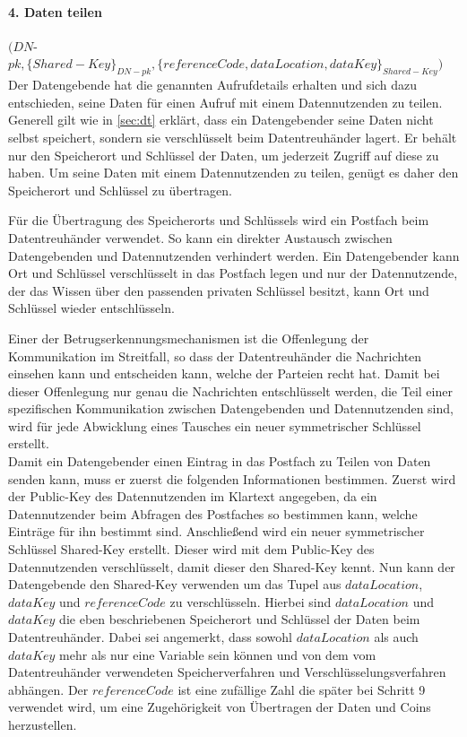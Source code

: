 \documentclass{scrreprt}
\begin{document}
\paragraph{4. Daten teilen} $(DN$-$pk, \{Shared-Key\}_{DN-pk}, \{referenceCode, dataLocation, dataKey\}_{Shared-Key})$\\
Der Datengebende hat die genannten Aufrufdetails erhalten und sich dazu entschieden, seine Daten für einen Aufruf mit einem Datennutzenden zu teilen. Generell gilt wie in \ref{sec:dt} erklärt, dass ein Datengebender seine Daten nicht selbst speichert, sondern sie verschlüsselt beim Datentreuhänder lagert. Er behält nur den Speicherort und Schlüssel der Daten, um jederzeit Zugriff auf diese zu haben. Um seine Daten mit einem Datennutzenden zu teilen, genügt es daher den Speicherort und Schlüssel zu übertragen.

Für die Übertragung des Speicherorts und Schlüssels wird ein Postfach beim Datentreuhänder verwendet. So kann ein direkter Austausch zwischen Datengebenden und Datennutzenden verhindert werden. Ein Datengebender kann Ort und Schlüssel verschlüsselt in das Postfach legen und nur der Datennutzende, der das Wissen über den passenden privaten Schlüssel besitzt, kann Ort und Schlüssel wieder entschlüsseln.

Einer der Betrugserkennungsmechanismen ist die Offenlegung der Kommunikation im Streitfall, so dass der Datentreuhänder die Nachrichten einsehen kann und entscheiden kann, welche der Parteien recht hat. Damit bei dieser Offenlegung nur genau die Nachrichten entschlüsselt werden, die Teil einer spezifischen Kommunikation zwischen Datengebenden und Datennutzenden sind, wird für jede Abwicklung eines Tausches ein neuer symmetrischer Schlüssel erstellt.\\

Damit ein Datengebender einen Eintrag in das Postfach zu Teilen von Daten senden kann, muss er zuerst die folgenden Informationen bestimmen. Zuerst wird der Public-Key des Datennutzenden im Klartext angegeben, da ein Datennutzender beim Abfragen des Postfaches so bestimmen kann, welche Einträge für ihn bestimmt sind. Anschließend wird ein neuer symmetrischer Schlüssel Shared-Key erstellt. Dieser wird mit dem Public-Key des Datennutzenden verschlüsselt, damit dieser den Shared-Key kennt. Nun kann der Datengebende den Shared-Key verwenden um das Tupel aus $dataLocation$, $dataKey$ und $referenceCode$ zu verschlüsseln. Hierbei sind $dataLocation$ und $dataKey$ die eben beschriebenen Speicherort und Schlüssel der Daten beim Datentreuhänder. Dabei sei angemerkt, dass sowohl $dataLocation$ als auch $dataKey$ mehr als nur eine Variable sein können und von dem vom Datentreuhänder verwendeten Speicherverfahren und Verschlüsselungsverfahren abhängen. Der $referenceCode$ ist eine zufällige Zahl die später bei Schritt 9 verwendet wird, um eine Zugehörigkeit von Übertragen der Daten und Coins herzustellen.
\end{document}
